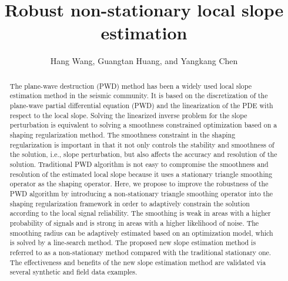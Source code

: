 
\title{Robust non-stationary local slope estimation}
\renewcommand{\thefootnote}{\fnsymbol{footnote}}
\author{Hang Wang\footnotemark[1], Guangtan Huang\footnotemark[1], and Yangkang Chen\footnotemark[1]}


\address{
\footnotemark[1]
School of Earth Sciences\\
Zhejiang University\\
Hangzhou, Zhejiang Province, China, 310027\\
chenyk2016@gmail.com \\}



\DeclareRobustCommand{\old}[1]{}
\DeclareRobustCommand{\new}[1]{#1}
\DeclareRobustCommand{\dlo}[1]{}
\DeclareRobustCommand{\wen}[1]{#1}

\begin{abstract}
The plane-wave destruction (PWD) method has been a widely used local slope estimation method in the seismic community. It is based on the discretization of the plane-wave partial differential equation (PWD) and the linearization of the PDE with respect to the local slope. Solving the linearized inverse problem for the slope perturbation is equivalent to solving a smoothness constrained optimization based on a shaping regularization method. The smoothness constraint in the shaping regularization is important in that it not only controls the stability and smoothness of the solution, i.e., slope perturbation, but also affects the accuracy and resolution of the solution. Traditional PWD algorithm is not easy to compromise the smoothness and resolution of the estimated local slope because it uses a stationary triangle smoothing operator as the shaping operator. Here, we propose to improve the robustness of the PWD algorithm by introducing a non-stationary triangle smoothing operator into the shaping regularization framework in order to adaptively constrain the solution according to the local signal reliability. The smoothing is weak in areas with a higher probability of signals and is strong in areas with a higher likelihood of noise. The smoothing radius can be adaptively estimated based on an optimization model, which is solved by a line-search method. The proposed new slope estimation method is referred to as a non-stationary method compared with the traditional stationary one. The effectiveness and benefits of the new slope estimation method are validated via several synthetic and field data examples.
\end{abstract}


